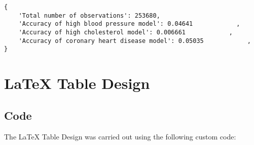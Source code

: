 \documentclass[11pt]{article}
\begin{document}
\begin{Verbatim}[tabsize=4]
{
    'Total number of observations': 253680,
    'Accuracy of high blood pressure model': 0.04641            ,
    'Accuracy of high cholesterol model': 0.006661            ,
    'Accuracy of coronary heart disease model': 0.05035            ,
}
\end{Verbatim}

\section{LaTeX Table Design} \subsection{Code}The LaTeX Table Design was carried out using the following custom code:
\end{document}

